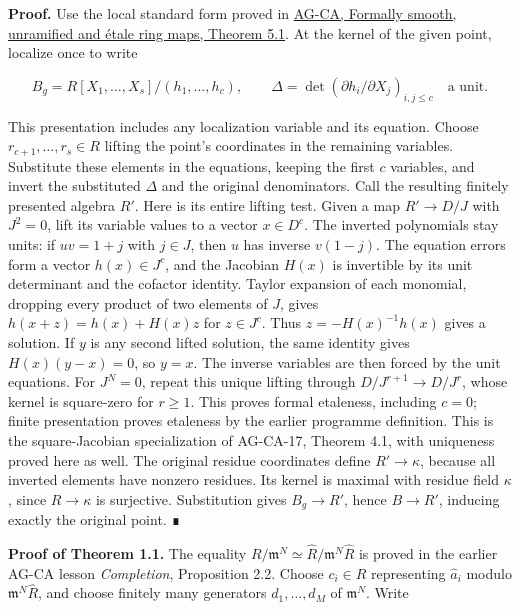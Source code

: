 \documentclass[11pt,a4paper,openany]{report}
\begin{document}
\textbf{Proof.} Use the local standard form proved in \href{https://github.com/KokunoYumeto/open-math-courses/blob/d02d0a3669f42579db037cd44de1d113fdd770a1/docs/courses/AG-CA/src/formally-smooth-unramified-and-etale-ring-maps.md\#5-from-a-split-sequence-to-local-coordinates}{AG-CA, Formally smooth, unramified and étale ring maps, Theorem 5.1}. At the kernel of the given point, localize once to write

\[
B_g=R[X_1,\ldots,X_s]/(h_1,\ldots,h_c),
\qquad
\Delta=\det(\partial h_i/\partial X_j)_{i,j\leq c}
\quad\text{a unit}.
\]

This presentation includes any localization variable and its equation. Choose \(r_{c+1},\ldots,r_s\in R\) lifting the point's coordinates in the remaining variables. Substitute these elements in the equations, keeping the first \(c\) variables, and invert the substituted \(\Delta\) and the original denominators. Call the resulting finitely presented algebra \(R'\). Here is its entire lifting test. Given a map \(R'\to D/J\) with \(J^2=0\), lift its variable values to a vector \(x\in D^c\). The inverted polynomials stay units: if \(uv=1+j\) with \(j\in J\), then \(u\) has inverse \(v(1-j)\). The equation errors form a vector \(h(x)\in J^c\), and the Jacobian \(H(x)\) is invertible by its unit determinant and the cofactor identity. Taylor expansion of each monomial, dropping every product of two elements of \(J\), gives \(h(x+z)=h(x)+H(x)z\) for \(z\in J^c\). Thus \(z=-H(x)^{-1}h(x)\) gives a solution. If \(y\) is any second lifted solution, the same identity gives \(H(x)(y-x)=0\), so \(y=x\). The inverse variables are then forced by the unit equations. For \(J^N=0\), repeat this unique lifting through \(D/J^{r+1}\to D/J^r\), whose kernel is square-zero for \(r\geq1\). This proves formal etaleness, including \(c=0\); finite presentation proves etaleness by the earlier programme definition. This is the square-Jacobian specialization of AG-CA-17, Theorem 4.1, with uniqueness proved here as well. The original residue coordinates define \(R'\to\kappa\), because all inverted elements have nonzero residues. Its kernel is maximal with residue field \(\kappa\), since \(R\to\kappa\) is surjective. Substitution gives \(B_g\to R'\), hence \(B\to R'\), inducing exactly the original point. ∎

\textbf{Proof of Theorem 1.1.} The equality \(R/\mathfrak m^N\simeq\widehat R/\mathfrak m^N\widehat R\) is proved in the earlier AG-CA lesson \emph{Completion}, Proposition 2.2. Choose \(c_i\in R\) representing \(\widehat a_i\) modulo \(\mathfrak m^N\widehat R\), and choose finitely many generators \(d_1,\ldots,d_M\) of \(\mathfrak m^N\). Write
\end{document}
